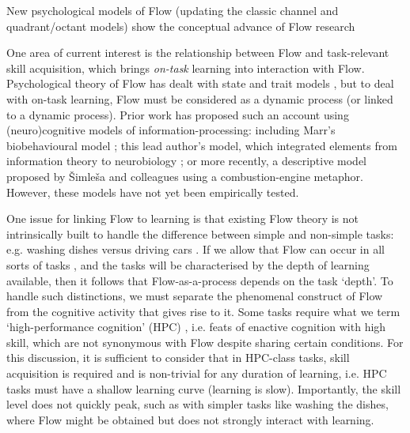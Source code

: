 \documentclass[fleqn,10pt]{wlscirep}
\begin{document}
New psychological models of Flow \cite{Keller2012} (updating the classic channel and quadrant/octant models) show the conceptual advance of Flow research

One area of current interest is the relationship between Flow and task-relevant skill acquisition, which brings {\it on-task} learning into interaction with Flow. Psychological theory of Flow has dealt with state and trait models \cite{Moneta2012}, but to deal with on-task learning, Flow must be considered as a dynamic process (or linked to a dynamic process). Prior work has proposed such an account using (neuro)cognitive models of information-processing: including Marr's biobehavioural model \cite{Marr2001}; this lead author's model, which integrated elements from information theory to neurobiology \cite{Cowley2008}; or more recently, a descriptive model proposed by {\v{S}}imle{\v{s}}a and colleagues \cite{Simlesa2018} using a combustion-engine metaphor. However, these models have not yet been empirically tested.

One issue for linking Flow to learning is that existing Flow theory is not intrinsically built to handle the difference between simple and non-simple tasks: e.g. washing dishes versus driving cars
. If we allow that Flow can occur in all sorts of tasks
, and the tasks will be characterised by the depth of learning available, then it follows that Flow-as-a-process depends on the task `depth'.
To handle such distinctions, we must separate the phenomenal construct of Flow from the cognitive activity that gives rise to it. Some tasks require what we term `high-performance cognition' (HPC)
, i.e. feats of enactive cognition with high skill, which are not synonymous with Flow despite sharing certain conditions. For this discussion, it is sufficient to consider that in HPC-class tasks, skill acquisition is required and is non-trivial for any duration of learning, i.e. HPC tasks must have a shallow learning curve (learning is slow). Importantly, the skill level does not quickly peak, such as with simpler tasks like washing the dishes, where Flow might be obtained but does not strongly interact with learning.
\end{document}
